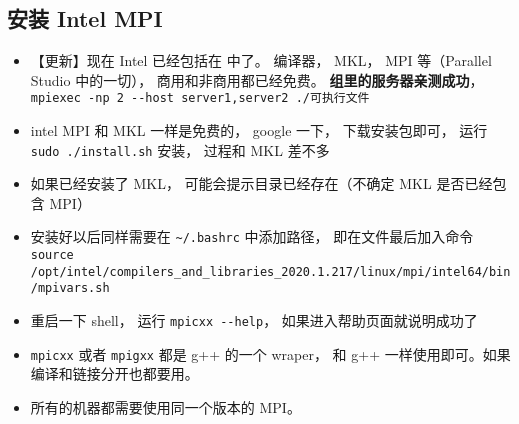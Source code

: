 \subsection{安装 Intel MPI}
\begin{itemize}
\item 【更新】现在 Intel 已经包括在  中了。 编译器， MKL， MPI 等（Parallel Studio 中的一切）， 商用和非商用都已经免费。 \textbf{组里的服务器亲测成功}， \verb`mpiexec -np 2 --host server1,server2 ./可执行文件`
\item intel MPI 和 MKL 一样是免费的， google 一下， 下载安装包即可， 运行 \verb`sudo ./install.sh` 安装， 过程和 MKL 差不多
\item 如果已经安装了 MKL， 可能会提示目录已经存在（不确定 MKL 是否已经包含 MPI）
\item 安装好以后同样需要在 \verb`~/.bashrc` 中添加路径， 即在文件最后加入命令 \verb`source /opt/intel/compilers_and_libraries_2020.1.217/linux/mpi/intel64/bin/mpivars.sh`
\item 重启一下 shell， 运行 \verb`mpicxx --help`， 如果进入帮助页面就说明成功了
\item \verb`mpicxx` 或者 \verb`mpigxx` 都是 g++ 的一个 wraper， 和 g++ 一样使用即可。如果编译和链接分开也都要用。
\item 所有的机器都需要使用同一个版本的 MPI。
\end{itemize}


